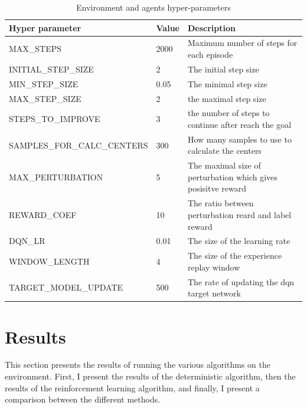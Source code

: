 \documentclass{article}
\begin{document}
\begin{table}[h]
\caption{Environment and agents hyper-parameters}
\label{tab:hyperparam}
\begin{tabular}{|l|l|l|}
\hline
\textbf{Hyper parameter}    & \textbf{Value} & \textbf{Description}                                          \\ \hline
MAX\_STEPS                  & 2000           & Maximum number of steps for each episode                      \\ \hline
INITIAL\_STEP\_SIZE         & 2              & The initial step size                                         \\ \hline
MIN\_STEP\_SIZE             & 0.05           & The minimal step size                                         \\ \hline
MAX\_STEP\_SIZE             & 2              & the maximal step size                                         \\ \hline
STEPS\_TO\_IMPROVE          & 3              & the number of steps to continue after reach the goal          \\ \hline
SAMPLES\_FOR\_CALC\_CENTERS & 300            & How many samples to use to calculate the centers              \\ \hline
MAX\_PERTURBATION           & 5              & The maximal size of perturbation which gives posisitve reward \\ \hline
REWARD\_COEF                & 10             & The ratio between perturbation reard and label reward         \\ \hline
DQN\_LR                     & 0.01           & The size of the learning rate                                 \\ \hline
WINDOW\_LENGTH              & 4              & The size of the experience replay window                      \\ \hline
TARGET\_MODEL\_UPDATE       & 500            & The rate of updating the dqn target network                   \\ \hline
\end{tabular}
\end{table}


\section{Results}
This section presents the results of running the various algorithms on the environment. First, I present the results of the deterministic algorithm, then the results of the reinforcement learning algorithm, and finally, I present a comparison between the different methods.
\end{document}
